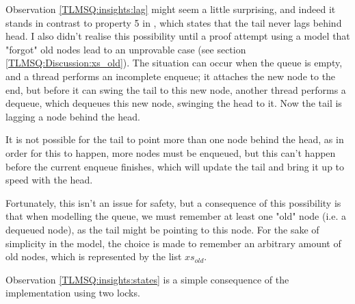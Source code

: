 \documentclass[a4paper, 11pt]{report}
\begin{document}
Observation \ref{TLMSQ:insights:lag} might seem a little surprising, and indeed it stands in contrast to property 5 in \cite{DBLP:conf/podc/MichaelS96}, which states that the tail never lags behind head. I also didn't realise this possibility until a proof attempt using a model that "forgot" old nodes lead to an unprovable case (see section \ref{TLMSQ:Discussion:xs_old}). The situation can occur when the queue is empty, and a thread performs an incomplete enqueue; it attaches the new node to the end, but before it can swing the tail to this new node, another thread performs a dequeue, which dequeues this new node, swinging the head to it. Now the tail is lagging a node behind the head.

It is not possible for the tail to point more than one node behind the head, as in order for this to happen, more nodes must be enqueued, but this can't happen before the current enqueue finishes, which will update the tail and bring it up to speed with the head.

Fortunately, this isn't an issue for safety, but a consequence of this possibility is that when modelling the queue, we must remember at least one "old" node (i.e. a dequeued node), as the tail might be pointing to this node. For the sake of simplicity in the model, the choice is made to remember an arbitrary amount of old nodes, which is represented by the list $xs_{old}$.

Observation \ref{TLMSQ:insights:states} is a simple consequence of the implementation using two locks.
\end{document}
